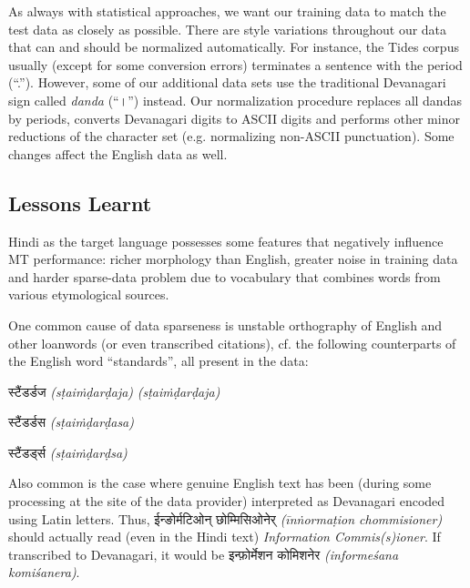 \documentclass[11pt]{article}
\newcommand{\hindi}[1]{{\hi #1}}
\newcommand{\translit}[1]{{\tl \textit{#1}}}
\begin{document}
As always with statistical approaches, we want our training data to match the
test data as closely as possible. There are style variations throughout our data
that can and should be normalized automatically. For instance, the Tides corpus
usually (except for some conversion errors) terminates a sentence with the
period (``.''). However, some of our additional data sets use the traditional
Devanagari sign called \textit{danda} (``\hindi{।}'') instead. Our normalization
procedure replaces all dandas by periods, converts Devanagari digits to ASCII
digits and performs other minor reductions of the character set (e.g.
normalizing
non-ASCII punctuation). Some changes affect the English data as well. 

\subsection{Lessons Learnt}

Hindi as the target language possesses some features that negatively influence
MT performance: richer morphology than English, greater noise in training data
and harder sparse-data problem due to vocabulary that combines words from
various etymological sources.

One common cause of data sparseness is unstable orthography of English and other
loanwords (or even transcribed citations), cf. the following counterparts of the
English word ``standards'', all present in the data:

\begin{compactitem}
\item \hindi{स्टैंडर्डज} \textit{(sṭaiṁḍarḍaja)} \translit{(sṭaiṁḍarḍaja)}
\item \hindi{स्टैंडर्डस} \textit{(sṭaiṁḍarḍasa)}
\item \hindi{स्टैंडर्ड्स} \textit{(sṭaiṁḍarḍsa)}
\end{compactitem}

Also common is the case where genuine English text has been (during some
processing at the site of the data provider) interpreted as Devanagari encoded
using Latin letters. Thus, \hindi{ईन्ङोर्मटिओन् छोम्मिसिओनेर्} \textit{(īnṅormaṭion
chommisioner)} should actually read (even in the Hindi text) \textit{Information
Commis(s)ioner}. If transcribed to Devanagari, it would be
\hindi{इन्फ़ोर्मेशन कोमिशनेर}
\textit{(informeśana komiśanera)}.
\end{document}
